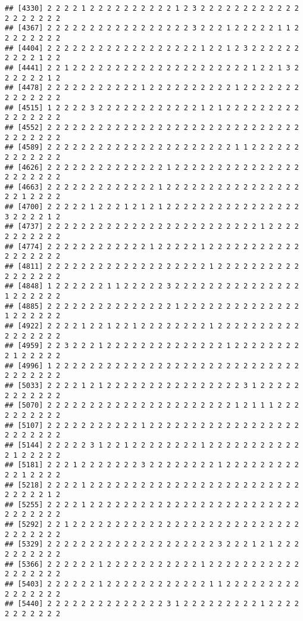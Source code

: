 \documentclass[
]{article}
\begin{document}
\begin{verbatim}
## [4330] 2 2 2 2 1 2 2 2 2 2 2 2 2 2 2 1 2 3 2 2 2 2 2 2 2 2 2 2 2 2 2 2 2 2 2 2 2
## [4367] 2 2 2 2 2 2 2 2 2 2 2 2 2 2 2 2 2 3 2 2 2 1 2 2 2 2 2 1 1 2 2 2 2 2 2 2 2
## [4404] 2 2 2 2 2 2 2 2 2 2 2 2 2 2 2 2 2 2 1 2 2 1 2 3 2 2 2 2 2 2 2 2 2 2 1 2 2
## [4441] 2 2 1 2 2 2 2 2 2 2 2 2 2 2 2 2 2 2 2 2 2 2 2 2 1 2 2 1 3 2 2 2 2 2 2 1 2
## [4478] 2 2 2 2 2 2 2 2 2 2 2 1 2 2 2 2 2 2 2 2 2 2 1 2 2 2 2 2 2 2 2 2 2 2 2 2 2
## [4515] 1 2 2 2 2 3 2 2 2 2 2 2 2 2 2 2 2 2 1 2 1 2 2 2 2 2 2 2 2 2 2 2 2 2 2 2 2
## [4552] 2 2 2 2 2 2 2 2 2 2 2 2 2 2 2 2 2 2 2 2 2 2 2 2 2 2 2 2 2 2 2 2 2 2 2 2 2
## [4589] 2 2 2 2 2 2 2 2 2 2 2 2 2 2 2 2 2 2 2 2 2 2 1 1 2 2 2 2 2 2 2 2 2 2 2 2 2
## [4626] 2 2 2 2 2 2 2 2 2 2 2 2 2 2 1 2 2 2 2 2 2 2 2 2 2 2 2 2 2 2 2 2 2 2 2 2 2
## [4663] 2 2 2 2 2 2 2 2 2 2 2 2 2 1 2 2 2 2 2 2 2 2 2 2 2 2 2 2 2 2 2 2 1 2 2 2 2
## [4700] 2 2 2 2 2 1 2 2 2 1 2 1 2 1 2 2 2 2 2 2 2 2 2 2 2 2 2 2 2 2 3 2 2 2 2 1 2
## [4737] 2 2 2 2 2 2 2 2 2 2 2 2 2 2 2 2 2 2 2 2 2 2 2 2 2 1 2 2 2 2 2 2 2 2 2 2 2
## [4774] 2 2 2 2 2 2 2 2 2 2 2 2 1 2 2 2 2 2 1 2 2 2 2 2 2 2 2 2 2 2 2 2 2 2 2 2 2
## [4811] 2 2 2 2 2 2 2 2 2 2 2 2 2 2 2 2 2 2 2 1 2 2 2 2 2 2 2 2 2 2 2 2 2 2 2 2 2
## [4848] 1 2 2 2 2 2 2 1 1 2 2 2 2 2 3 2 2 2 2 2 2 2 2 2 2 2 2 2 2 2 1 2 2 2 2 2 2
## [4885] 2 2 2 2 2 2 2 2 2 2 2 2 2 2 2 1 2 2 2 2 2 2 2 2 2 2 2 2 2 2 1 2 2 2 2 2 2
## [4922] 2 2 2 2 1 2 2 1 2 2 1 2 2 2 2 2 2 2 2 1 2 2 2 2 2 2 2 2 2 2 2 2 2 2 2 2 2
## [4959] 2 2 3 2 2 2 1 2 2 2 2 2 2 2 2 2 2 2 2 2 2 1 2 2 2 2 2 2 2 2 2 1 2 2 2 2 2
## [4996] 1 2 2 2 2 2 2 2 2 2 2 2 2 2 2 2 2 2 2 2 2 2 2 2 2 2 2 2 2 2 2 2 2 2 2 2 2
## [5033] 2 2 2 2 1 2 1 2 2 2 2 2 2 2 2 2 2 2 2 2 2 2 2 3 1 2 2 2 2 2 2 2 2 2 2 2 2
## [5070] 2 2 2 2 2 2 2 2 2 2 2 2 2 2 2 2 2 2 2 2 2 2 1 2 1 1 1 2 2 2 2 2 2 2 2 2 2
## [5107] 2 2 2 2 2 2 2 2 2 2 2 1 2 2 2 2 2 2 2 2 2 2 2 2 2 2 2 2 2 2 2 2 2 2 2 2 2
## [5144] 2 2 2 2 2 3 1 2 2 1 2 2 2 2 2 2 2 2 1 2 2 2 2 2 2 2 2 2 2 2 2 1 2 2 2 2 2
## [5181] 2 2 2 1 2 2 2 2 2 2 2 3 2 2 2 2 2 2 2 2 1 2 2 2 2 2 2 2 2 2 2 2 1 2 2 2 2
## [5218] 2 2 2 2 1 2 2 2 2 2 2 2 2 2 2 2 2 2 2 2 2 2 2 2 2 2 2 2 2 2 2 2 2 2 2 1 2
## [5255] 2 2 2 2 1 2 2 2 2 2 2 2 2 2 2 2 2 2 2 2 2 2 2 2 2 2 2 2 2 2 2 2 2 2 2 2 2
## [5292] 2 2 1 2 2 2 2 2 2 2 2 2 2 2 2 2 2 2 2 2 2 2 2 2 2 2 2 2 2 2 2 2 2 2 2 2 2
## [5329] 2 2 2 2 2 2 2 2 2 2 2 2 2 2 2 2 2 2 2 2 3 2 2 2 1 2 1 2 2 2 2 2 2 2 2 2 2
## [5366] 2 2 2 2 2 2 1 2 2 2 2 2 2 2 2 2 2 2 1 2 2 2 2 2 2 2 2 2 2 2 2 2 2 2 2 2 2
## [5403] 2 2 2 2 2 2 1 2 2 2 2 2 2 2 2 2 2 2 2 1 1 2 2 2 2 2 2 2 2 2 2 2 2 2 2 2 2
## [5440] 2 2 2 2 2 2 2 2 2 2 2 2 2 2 3 1 2 2 2 2 2 2 2 2 2 1 2 2 2 2 2 2 2 2 2 2 2

\end{verbatim}
\end{document}
